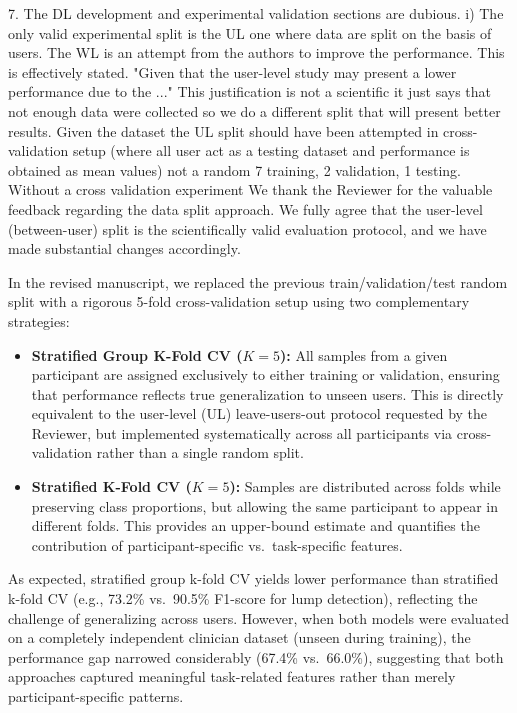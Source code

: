 \documentclass[a4paper, onecolumn]{IEEEtran}
\newcommand\blue[1]{{\textcolor{white!30!blue}{#1}}}
\begin{document}
\blue{7. The DL development and experimental validation sections are dubious. 
i) The only valid experimental split is the UL one where data are split on the basis of users. The WL is an attempt from the authors to improve the performance. This is effectively stated.  "Given that the user-level study may present a lower performance due to the ..." This justification is not a scientific it just says that not enough data were collected so we do a different split that will present better results. Given the dataset the UL split should have been attempted in cross-validation setup (where all user act as a testing dataset and performance is obtained as mean values) not a random 7 training, 2 validation, 1 testing. Without a cross validation experiment}
We thank the Reviewer for the valuable feedback regarding the data split approach. We fully agree that the user-level (between-user) split is the scientifically valid evaluation protocol, and we have made substantial changes accordingly.

In the revised manuscript, we replaced the previous train/validation/test random split with a rigorous 5-fold cross-validation setup using two complementary strategies:
\begin{itemize}
    \item \textbf{Stratified Group K-Fold CV ($K=5$):} All samples from a given participant are assigned exclusively to either training or validation, ensuring that performance reflects true generalization to unseen users. This is directly equivalent to the user-level (UL) leave-users-out protocol requested by the Reviewer, but implemented systematically across all participants via cross-validation rather than a single random split.
    \item \textbf{Stratified K-Fold CV ($K=5$):} Samples are distributed across folds while preserving class proportions, but allowing the same participant to appear in different folds. This provides an upper-bound estimate and quantifies the contribution of participant-specific vs.\ task-specific features.
\end{itemize}

As expected, stratified group k-fold CV yields lower performance than stratified k-fold CV (e.g., 73.2\% vs.\ 90.5\% F1-score for lump detection), reflecting the challenge of generalizing across users. However, when both models were evaluated on a completely independent clinician dataset (unseen during training), the performance gap narrowed considerably (67.4\% vs.\ 66.0\%), suggesting that both approaches captured meaningful task-related features rather than merely participant-specific patterns.
\end{document}
